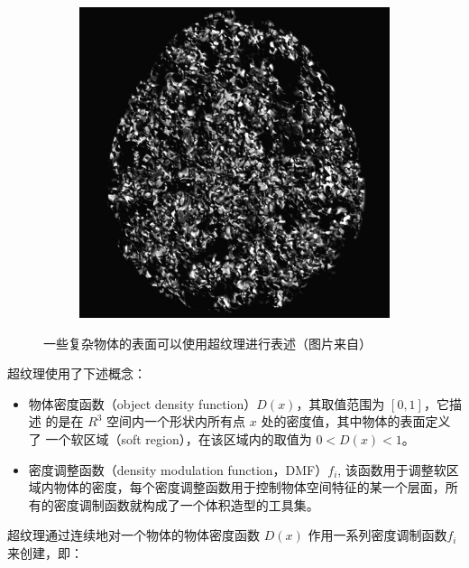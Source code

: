 \begin{figure}
\begin{subfigure}[b]{0.33\textwidth}
	\end{subfigure}
	\begin{subfigure}[b]{0.33\textwidth}
		\includegraphics[width=\textwidth]{figures/df/hypertexture3}
	\end{subfigure}
	\caption{一些复杂物体的表面可以使用超纹理进行表述（图片来自\cite{a:hypetrtexture}）}
	\label{f:df-hypetrtexture}
\end{figure}

超纹理使用了下述概念：

\begin{itemize}
	\item 物体密度函数（object density function）$D(x)$，其取值范围为 $[0,1]$，它描述 的是在 $R^{3}$ 空间内一个形状内所有点 $x$ 处的密度值，其中物体的表面定义了 一个软区域（soft region），在该区域内的取值为 $0 < D(x) < 1$。
	\item 密度调整函数（density modulation function，DMF）$f_i$, 该函数用于调整软区域内物体的密度，每个密度调整函数用于控制物体空间特征的某一个层面，所有的密度调制函数就构成了一个体积造型的工具集。
\end{itemize}

超纹理通过连续地对一个物体的物体密度函数 $D(x)$ 作用一系列密度调制函数$f_i$来创建，即：

